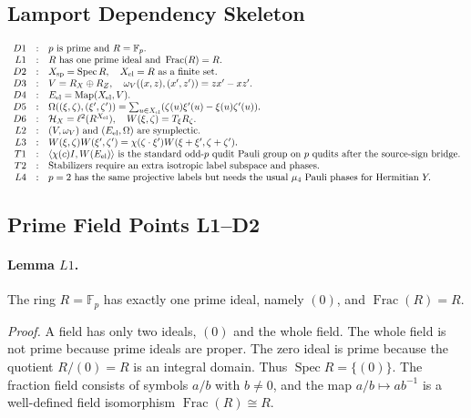 \subsection{Lamport Dependency Skeleton}

\[
\begin{array}{rcl}
D1&:&p\text{ is prime and }R=\mathbb F_p.\\
L1&:&R\text{ has one prime ideal and }\operatorname{Frac}(R)=R.\\
D2&:&X_{\rm sp}=\operatorname{Spec}R,\quad X_{\rm el}=R\text{ as a finite set.}\\
D3&:&V=R_X\oplus R_Z,\quad
       \omega_V((x,z),(x',z'))=zx'-xz'.\\
D4&:&E_{\rm el}=\operatorname{Map}(X_{\rm el},V).\\
D5&:&\Omega((\xi,\zeta),(\xi',\zeta'))=
       \sum_{u\in X_{\rm el}}(\zeta(u)\xi'(u)-\xi(u)\zeta'(u)).\\
D6&:&\mathcal H_X=\ell^2(R^{X_{\rm el}}),\quad W(\xi,\zeta)=T_\xi R_\zeta.\\
L2&:&(V,\omega_V)\text{ and }(E_{\rm el},\Omega)\text{ are symplectic.}\\
L3&:&W(\xi,\zeta)W(\xi',\zeta')
       =\chi(\zeta\cdot\xi')W(\xi+\xi',\zeta+\zeta').\\
T1&:&\langle\chi(c)I,W(E_{\rm el})\rangle
       \text{ is the standard odd-}p\text{ qudit Pauli group on }p
       \text{ qudits after the source-sign bridge.}\\
T2&:&\text{Stabilizers require an extra isotropic label subspace and phases.}\\
L4&:&p=2\text{ has the same projective labels but needs the usual }\mu_4
       \text{ Pauli phases for Hermitian }Y.
\end{array}
\]

\subsection{Prime Field Points L1--D2}

\paragraph{Lemma \(L1\).}
The ring \(R=\mathbb F_p\) has exactly one prime ideal, namely \((0)\), and
\(\operatorname{Frac}(R)=R\).

\emph{Proof.}
A field has only two ideals, \((0)\) and the whole field.  The whole field is
not prime because prime ideals are proper.  The zero ideal is prime because
the quotient \(R/(0)=R\) is an integral domain.  Thus
\(\operatorname{Spec}R=\{(0)\}\).  The fraction field consists of symbols
\(a/b\) with \(b\ne0\), and the map \(a/b\mapsto ab^{-1}\) is a well-defined
field isomorphism \(\operatorname{Frac}(R)\cong R\).

